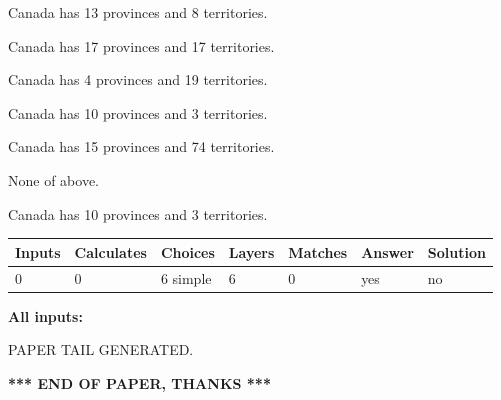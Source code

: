 \documentclass[12pt]{article}
\begin{document}
 
Canada has  13 provinces and  8 territories.
 
 
Canada has  17 provinces and  17 territories.
 
 
Canada has   4 provinces and  19 territories.
 
 
Canada has 10  provinces and 3 territories.
 
 
Canada has  15 provinces and  74 territories.
 
 
 None of above.
 
 
\noindent{}
 
 
Canada has 10  provinces and 3 territories.
 
 
\noindent{}
 
 
   
   
   
   
\noindent\begin{tabular}{|l|l|l|l|l|l|l|}
 \hline
Inputs & Calculates & Choices & Layers & Matches & Answer & Solution \\ \hline
 0  & 
 0  & 
 6
  simple  
  & 
 6  & 
 0  & 
  yes & 
  no 
  \\ \hline
 \end{tabular}
   
   
   
   
\noindent{}
   
   
   
   
\noindent\vspace{0.1in}\hspace{-0.08in} {\textbf{\Large{All inputs: }}}
   
   
   
   
   
   
 \vspace{0.2in}
 
   
   
\vspace{2.0in} PAPER TAIL GENERATED.
   
   
   
   
\vspace{1.0in} 
{\textbf{\large{ *** END OF PAPER, THANKS *** }}} 
   
\end{document}

